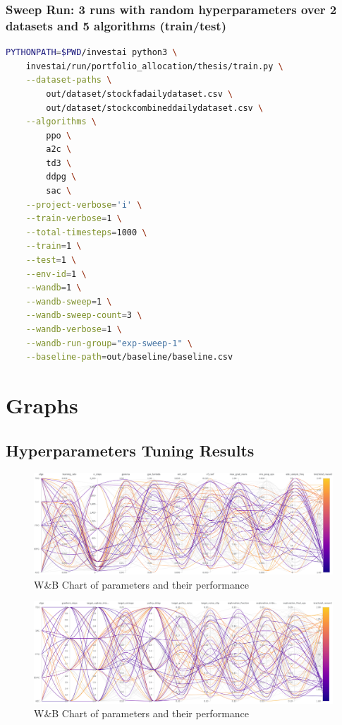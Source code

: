 \documentclass[../xlapes02]{subfiles}
\begin{document}
    \subsection{Sweep Run: 3 runs with random hyperparameters over 2 datasets and 5 algorithms (train/test)}\label{subsec:sweep-run:-3-runs-with-random-hyperparameters-over-2-datasets-and-5-algorithms-(train/test)}
    \begin{lstlisting}[language=bash,label={lst:sweep-train}]
PYTHONPATH=$PWD/investai python3 \
    investai/run/portfolio_allocation/thesis/train.py \
    --dataset-paths \
        out/dataset/stockfadailydataset.csv \
        out/dataset/stockcombineddailydataset.csv \
    --algorithms \
        ppo \
        a2c \
        td3 \
        ddpg \
        sac \
    --project-verbose='i' \
    --train-verbose=1 \
    --total-timesteps=1000 \
    --train=1 \
    --test=1 \
    --env-id=1 \
    --wandb=1 \
    --wandb-sweep=1 \
    --wandb-sweep-count=3 \
    --wandb-verbose=1 \
    --wandb-run-group="exp-sweep-1" \
    --baseline-path=out/baseline/baseline.csv
    \end{lstlisting}


    \chapter{Graphs}\label{ch:graphs}


    \section{Hyperparameters Tuning Results}\label{sec:hyperparameters-tuning-results}
    \begin{figure}[H]
        \centering
        \includegraphics[width=\linewidth]{image/wandb/wb1}
        \caption{W\&B Chart of parameters and their performance}
        \label{fig:wb-chart1}
    \end{figure}

    \begin{figure}[H]
        \centering
        \includegraphics[width=\linewidth]{image/wandb/wb2}
        \caption{W\&B Chart of parameters and their performance}
        \label{fig:wb-chart2}
    \end{figure}
\end{document}
